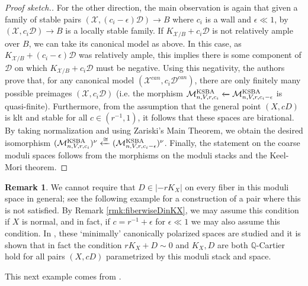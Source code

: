 \documentclass[11pt]{amsart}
\numberwithin{equation}{section}
\theoremstyle{definition}
\newtheorem{remark}[theorem]{Remark}
\newcommand{\bQ}{\mathbb{Q}}
\newcommand{\calX}{\mathcal{X}}
\newcommand{\KSBA}{{\rm KSBA}}
\newcommand{\calD}{\mathcal{D}}
\newcommand{\cM}{\mathcal M}
\begin{document}
\begin{proof}[Proof sketch.]
 For the other direction, the main observation is again that given a family of stable pairs $(\calX, (c_i - \epsilon) \calD) \to B$ where $c_i$ is a wall and $\epsilon \ll 1$, by \cite{KM98} $(\calX, c_i \calD) \to B$ is a locally stable family.  If $K_{\calX/B} + c_i \calD$ is not relatively ample over $B$, we can take its canonical model as above.  In this case, as $K_{\calX/B} + (c_i-\epsilon) \calD$ was relatively ample, this implies there is some component of $\calD$ on which $K_{\calX/B} + c_i \calD$ must be negative.  Using this negativity, the authors prove that, for any canonical model $(\calX^{can}, c_i  \calD^{can})$, there are only finitely many possible preimages $(\calX, c_i \calD)$ (i.e. the morphism $\cM^{\KSBA}_{n,V,r,c_i}\xleftarrow{}\cM^{\KSBA}_{n,V,r,c_i-\epsilon}$ is quasi-finite).  Furthermore, from the assumption that the general point $(X,cD)$ is klt and stable for all $c \in (r^{-1},1)$, it follows that these spaces are birational. By taking normalization and using Zariski's Main Theorem, we obtain the desired isomorphism $(\cM^{\KSBA}_{n,V,r,c_i})^\nu\xleftarrow{\cong}(\cM^{\KSBA}_{n,V,r,c_i-\epsilon})^\nu$.  Finally, the statement on the coarse moduli spaces follows from the morphisms on the moduli stacks and the Keel-Mori theorem. 
\end{proof}

\begin{remark}
    We cannot require that $D \in|-rK_X|$ on every fiber in this moduli space in general; see the following example for a construction of a pair where this is not satisfied.  By Remark \ref{rmk:fiberwiseDinKX}, we may assume this condition if $X$ is normal, and in fact, if $c = r^{-1} + \epsilon$ for $\epsilon \ll 1$ we may also assume this condition.  In \cite{hacking, devleming,KX19}, these `minimally' canonically polarized spaces are studied and it is shown that in fact the condition $r K_X + D \sim 0$ and $K_X, D$ are both $\bQ$-Cartier hold for all pairs $(X,cD)$ parametrized by this moduli stack and space. 
\end{remark}

This next example comes from \cite{DeVSingh}.
\end{document}
